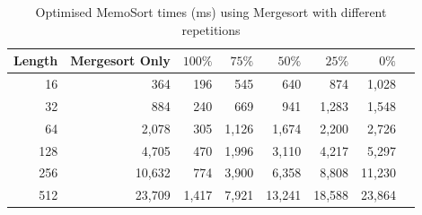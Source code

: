 \documentclass[a4paper,12pt]{article}
\begin{document}
\begin{table}[H]
\centering
\begin{tabular}{|r|r|r|r|r|r|r|r|}   \hline
	{Length} & {Mergesort Only} & {$100\%$} & {$75\%$} & {$50\%$} & {$25\%$} & {$0\%$} \\  \hline
	16 &364&196&545 & 640 &874&1,028\\ 
	32 &884&240&669 & 941&1,283&1,548\\ 
	64 &2,078&305 &1,126&1,674&2,200&2,726\\ 
	128 &4,705&470&1,996&3,110&4,217&5,297\\ 
	256 &10,632&774&3,900&6,358&8,808&11,230\\ 
	512 &23,709& 1,417&7,921&13,241&18,588&23,864\\  \hline
\end{tabular}
\caption{Optimised MemoSort times (ms) using Mergesort with different repetitions}
\end{table}


\end{document}
